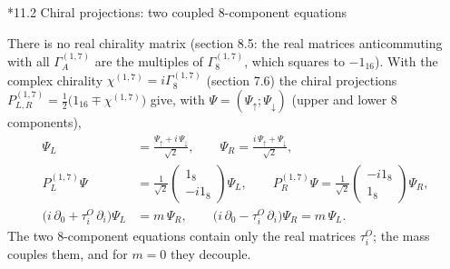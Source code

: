 \documentclass[10pt,a4paper]{article}
\makeatletter
\renewcommand\subsection{\@startsection{subsection}{2}{\z@}{-3.25ex\@plus -1ex \@minus -.2ex}{1.5ex \@plus .2ex}{\normalfont\large\bfseries\raggedright}}
\makeatother
\begin{document}
\subsection*{11.2 Chiral projections: two coupled 8-component equations}
There is no real chirality matrix (section 8.5: the real matrices anticommuting with all $\Gamma^{(1,7)}_A$ are the multiples of $\Gamma^{(1,7)}_8$, which squares to $-1_{16}$). With the complex chirality $\chi^{(1,7)}=i\Gamma^{(1,7)}_8$ (section 7.6) the chiral projections $P^{(1,7)}_{L,R}=\frac12\big(1_{16}\mp\chi^{(1,7)}\big)$ give, with $\Psi=(\Psi_\uparrow;\Psi_\downarrow)$ (upper and lower 8 components),
\begin{align*}
\Psi_L&=\frac{\Psi_\uparrow+i\,\Psi_\downarrow}{\sqrt2},\qquad \Psi_R=\frac{i\,\Psi_\uparrow+\Psi_\downarrow}{\sqrt2}, \\
P^{(1,7)}_L\Psi&=\frac1{\sqrt2}\begin{pmatrix}1_8\\-i1_8\end{pmatrix}\Psi_L,\qquad P^{(1,7)}_R\Psi=\frac1{\sqrt2}\begin{pmatrix}-i1_8\\1_8\end{pmatrix}\Psi_R, \\
\big(i\,\partial_0+\tau^{O}_i\,\partial_i\big)\Psi_L&=m\,\Psi_R,\qquad \big(i\,\partial_0-\tau^{O}_i\,\partial_i\big)\Psi_R=m\,\Psi_L .
\end{align*}
The two 8-component equations contain only the real matrices $\tau^{O}_i$; the mass couples them, and for $m=0$ they decouple.
\end{document}
